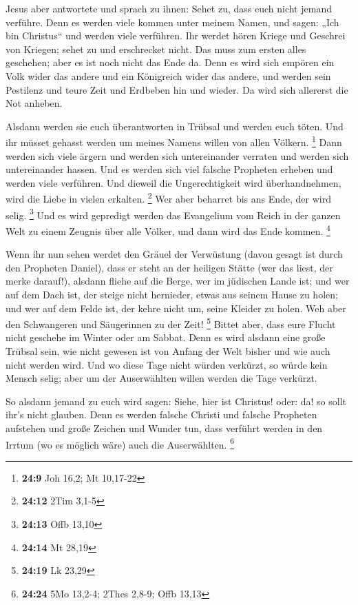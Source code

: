  Jesus aber antwortete und sprach zu ihnen: Sehet zu, dass
euch nicht jemand verführe.  Denn es werden viele kommen
unter meinem Namen, und sagen: „Ich bin Christus`` und werden viele
verführen.  Ihr werdet hören Kriege und Geschrei von
Kriegen; sehet zu und erschrecket nicht. Das muss zum ersten alles
geschehen; aber es ist noch nicht das Ende da.  Denn es
wird sich empören ein Volk wider das andere und ein Königreich wider das
andere, und werden sein Pestilenz und teure Zeit und Erdbeben hin und
wieder.  Da wird sich allererst die Not anheben.

 Alsdann werden sie euch überantworten in Trübsal und
werden euch töten. Und ihr müsset gehasst werden um meines Namens willen
von allen Völkern. \footnote{\textbf{24:9} Joh 16,2; Mt 10,17-22}
 Dann werden sich viele ärgern und werden sich
untereinander verraten und werden sich untereinander hassen.
 Und es werden sich viel falsche Propheten erheben und
werden viele verführen.  Und dieweil die Ungerechtigkeit
wird überhandnehmen, wird die Liebe in vielen erkalten. \footnote{\textbf{24:12}
  2Tim 3,1-5}  Wer aber beharret bis ans Ende, der wird
selig. \footnote{\textbf{24:13} Offb 13,10}  Und es wird
gepredigt werden das Evangelium vom Reich in der ganzen Welt zu einem
Zeugnis über alle Völker, und dann wird das Ende kommen. \footnote{\textbf{24:14}
  Mt 28,19}

 Wenn ihr nun sehen werdet den Gräuel der Verwüstung
(davon gesagt ist durch den Propheten Daniel), dass er steht an der
heiligen Stätte (wer das liest, der merke darauf!), 
alsdann fliehe auf die Berge, wer im jüdischen Lande ist;
 und wer auf dem Dach ist, der steige nicht hernieder,
etwas aus seinem Hause zu holen;  und wer auf dem Felde
ist, der kehre nicht um, seine Kleider zu holen.  Weh
aber den Schwangeren und Säugerinnen zu der Zeit! \footnote{\textbf{24:19}
  Lk 23,29}  Bittet aber, dass eure Flucht nicht geschehe
im Winter oder am Sabbat.  Denn es wird alsdann eine
große Trübsal sein, wie nicht gewesen ist von Anfang der Welt bisher und
wie auch nicht werden wird.  Und wo diese Tage nicht
würden verkürzt, so würde kein Mensch selig; aber um der Auserwählten
willen werden die Tage verkürzt.

 So alsdann jemand zu euch wird sagen: Siehe, hier ist
Christus! oder: da! so sollt ihr's nicht glauben.  Denn
es werden falsche Christi und falsche Propheten aufstehen und große
Zeichen und Wunder tun, dass verführt werden in den Irrtum (wo es
möglich wäre) auch die Auserwählten. \footnote{\textbf{24:24} 5Mo
  13,2-4; 2Thes 2,8-9; Offb 13,13}

